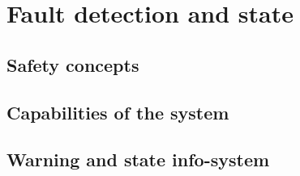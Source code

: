 \documentclass[ExampleMasters.tex]{subfiles}
\begin{document}
\clearpage


\chapter{Fault detection and state}

\section{Safety concepts}

\section{Capabilities of the system}

\section{Warning and state info-system}
\end{document}
